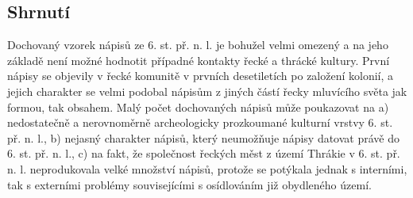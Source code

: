 
\subsection[shrnutí-3]{Shrnutí}

Dochovaný vzorek nápisů ze 6. st. př. n. l. je bohužel velmi omezený a na jeho základě není možné hodnotit případné kontakty řecké a thrácké kultury. První nápisy se objevily v řecké komunitě v prvních desetiletích po založení kolonií, a jejich charakter se velmi podobal nápisům z jiných částí řecky mluvícího světa jak formou, tak obsahem. Malý počet dochovaných nápisů může poukazovat na a) nedostatečně a nerovnoměrně archeologicky prozkoumané kulturní vrstvy 6. st. př. n. l., b) nejasný charakter nápisů, který neumožňuje nápisy datovat právě do 6. st. př. n. l., c) na fakt, že společnost řeckých měst z území Thrákie v 6. st. př. n. l. neprodukovala velké množství nápisů, protože se potýkala jednak s interními, tak s externími problémy souvisejícími s osídlováním již obydleného území.

